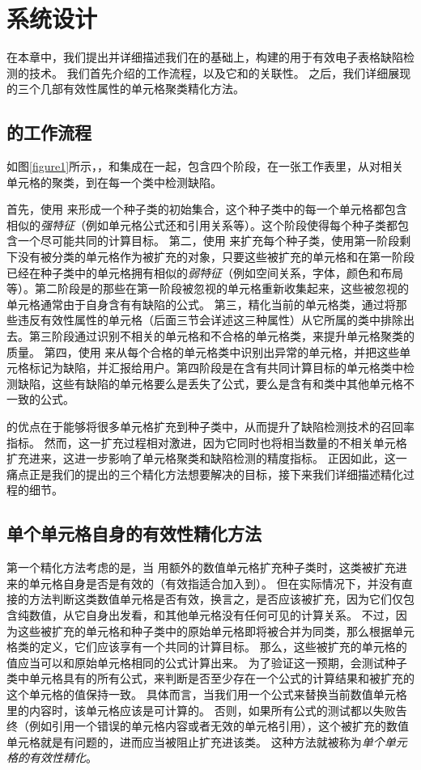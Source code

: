 \chapter{系统设计}
在本章中，我们提出并详细描述我们在\cu 的基础上，构建的用于有效电子表格缺陷检测的技术\wa 。
我们首先介绍\wa 的工作流程，以及它和\cu 的关联性。
之后，我们详细展现\wa 的三个几部有效性属性的单元格聚类精化方法。


\section{\wa 的工作流程}

如图\ref{figure1}所示，\wa ，和\cu 集成在一起，包含四个阶段，在一张工作表里，从对相关单元格的聚类，到在每一个类中检测缺陷。

首先，\wa 使用 \cu 来形成一个种子类的初始集合，这个种子类中的每一个单元格都包含相似的\textit{强特征}（例如单元格公式还和引用关系等）。这个阶段使得每个种子类都包含一个尽可能共同的计算目标。
第二，\wa 使用 \cu 来扩充每个种子类，使用第一阶段剩下没有被分类的单元格作为被扩充的对象，只要这些被扩充的单元格和在第一阶段已经在种子类中的单元格拥有相似的\textit{弱特征}（例如空间关系，字体，颜色和布局等）。第二阶段是的那些在第一阶段被忽视的单元格重新收集起来，这些被忽视的单元格通常由于自身含有有缺陷的公式。
第三，\wa 精化当前的单元格类，通过将那些违反有效性属性的单元格（后面三节会详述这三种属性）从它所属的类中排除出去。第三阶段通过识别不相关的单元格和不合格的单元格类，来提升单元格聚类的质量。
第四，\wa 使用 \cu 来从每个合格的单元格类中识别出异常的单元格，并把这些单元格标记为缺陷，并汇报给用户。第四阶段是在含有共同计算目标的单元格类中检测缺陷，这些有缺陷的单元格要么是丢失了公式，要么是含有和类中其他单元格不一致的公式。

\cu 的优点在于能够将很多单元格扩充到种子类中，从而提升了缺陷检测技术的召回率指标\cite{cheung2016custodes}。
然而，这一扩充过程相对激进，因为它同时也将相当数量的不相关单元格扩充进来，这进一步影响了单元格聚类和缺陷检测的精度指标。
正因如此，这一痛点正是我们的\wa 提出的三个精化方法想要解决的目标，接下来我们详细描述精化过程的细节。


\section{单个单元格自身的有效性精化方法}

第一个精化方法考虑的是，当 \wa 用额外的数值单元格扩充种子类时，这类被扩充进来的单元格自身是否是有效的（有效指适合加入到）。
但在实际情况下，并没有直接的方法判断这类数值单元格是否有效，换言之，是否应该被扩充，因为它们仅包含纯数值，从它自身出发看，和其他单元格没有任何可见的计算关系。
不过，因为这些被扩充的单元格和种子类中的原始单元格即将被合并为同类，那么根据单元格类的定义，它们应该享有一个共同的计算目标。
那么，这些被扩充的单元格的值应当可以和原始单元格相同的公式计算出来。
为了验证这一预期，\wa 会测试种子类中单元格具有的所有公式，来判断是否至少存在一个公式的计算结果和被扩充的这个单元格的值保持一致。
具体而言，当我们用一个公式来替换当前数值单元格里的内容时，该单元格应该是可计算的。
否则，如果所有公式的测试都以失败告终（例如引用一个错误的单元格内容或者无效的单元格引用），这个被扩充的数值单元格就是有问题的，进而应当被阻止扩充进该类。
这种方法就被称为\textit{单个单元格的有效性精化}。

